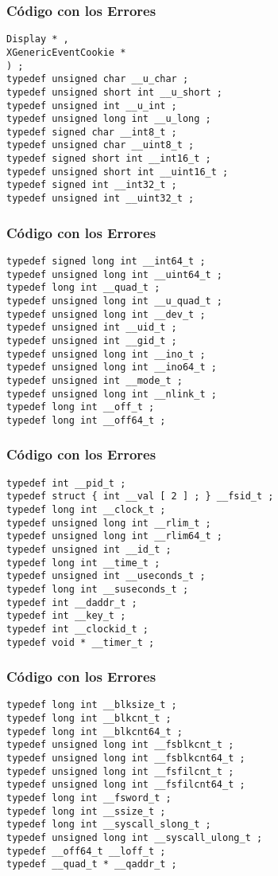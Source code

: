 \documentclass{beamer}
\begin{document}
\begin{frame}[fragile]
\frametitle{C\'odigo con los Errores}
\begin{verbatim}
Display * , 
XGenericEventCookie * 
) ; 
typedef unsigned char __u_char ; 
typedef unsigned short int __u_short ; 
typedef unsigned int __u_int ; 
typedef unsigned long int __u_long ; 
typedef signed char __int8_t ; 
typedef unsigned char __uint8_t ; 
typedef signed short int __int16_t ; 
typedef unsigned short int __uint16_t ; 
typedef signed int __int32_t ; 
typedef unsigned int __uint32_t ; 
\end{verbatim}
\end{frame}
\begin{frame}[fragile]
\frametitle{C\'odigo con los Errores}
\begin{verbatim}
typedef signed long int __int64_t ; 
typedef unsigned long int __uint64_t ; 
typedef long int __quad_t ; 
typedef unsigned long int __u_quad_t ; 
typedef unsigned long int __dev_t ; 
typedef unsigned int __uid_t ; 
typedef unsigned int __gid_t ; 
typedef unsigned long int __ino_t ; 
typedef unsigned long int __ino64_t ; 
typedef unsigned int __mode_t ; 
typedef unsigned long int __nlink_t ; 
typedef long int __off_t ; 
typedef long int __off64_t ; 
\end{verbatim}
\end{frame}
\begin{frame}[fragile]
\frametitle{C\'odigo con los Errores}
\begin{verbatim}
typedef int __pid_t ; 
typedef struct { int __val [ 2 ] ; } __fsid_t ; 
typedef long int __clock_t ; 
typedef unsigned long int __rlim_t ; 
typedef unsigned long int __rlim64_t ; 
typedef unsigned int __id_t ; 
typedef long int __time_t ; 
typedef unsigned int __useconds_t ; 
typedef long int __suseconds_t ; 
typedef int __daddr_t ; 
typedef int __key_t ; 
typedef int __clockid_t ; 
typedef void * __timer_t ; 
\end{verbatim}
\end{frame}
\begin{frame}[fragile]
\frametitle{C\'odigo con los Errores}
\begin{verbatim}
typedef long int __blksize_t ; 
typedef long int __blkcnt_t ; 
typedef long int __blkcnt64_t ; 
typedef unsigned long int __fsblkcnt_t ; 
typedef unsigned long int __fsblkcnt64_t ; 
typedef unsigned long int __fsfilcnt_t ; 
typedef unsigned long int __fsfilcnt64_t ; 
typedef long int __fsword_t ; 
typedef long int __ssize_t ; 
typedef long int __syscall_slong_t ; 
typedef unsigned long int __syscall_ulong_t ; 
typedef __off64_t __loff_t ; 
typedef __quad_t * __qaddr_t ; 
\end{verbatim}
\end{frame}
\end{document}
